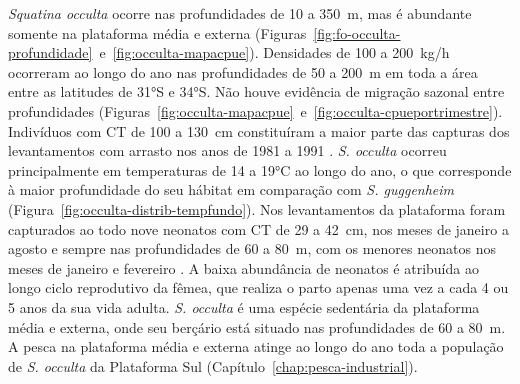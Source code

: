\documentclass[a4paper,11pt,twoside,showtrims,onecolumn,openright,final]{memoir}
\begin{document}
\emph{Squatina occulta} ocorre nas profundidades de 10 a 350~m, mas é abundante somente 
na plataforma média e externa (Figuras~\ref{fig:fo-occulta-profundidade}~e~\ref{fig:occulta-mapacpue}). %
Densidades de 100 a 200~kg/h ocorreram ao longo do ano nas profundidades de 50 a 200~m 
em toda a área entre as latitudes de 31°S e 34°S. Não houve evidência de migração 
sazonal entre profundidades (Figuras~\ref{fig:occulta-mapacpue}~e~\ref{fig:occulta-cpueportrimestre}). %
Indivíduos com CT de 100 a 130~cm constituíram a maior parte das capturas dos levantamentos 
com arrasto nos anos de 1981 a 1991 \citep{silva1996}. %
\emph{S. occulta} ocorreu principalmente em temperaturas de 14 a 19°C ao longo do ano, 
o que corresponde à maior profundidade do seu hábitat em comparação com \emph{S. guggenheim} (Figura~\ref{fig:occulta-distrib-tempfundo}). %
Nos levantamentos da plataforma foram capturados ao todo nove neonatos com CT de 29 a 42~cm, 
nos meses de janeiro a agosto e sempre nas profundidades de 60 a 80~m, com os menores neonatos 
nos meses de janeiro e fevereiro \citep{silva1996}. %
A baixa abundância de neonatos é atribuída ao longo ciclo reprodutivo da fêmea, que 
realiza o parto apenas uma vez a cada 4 ou 5 anos da sua vida adulta. 
\emph{S. occulta} é uma espécie sedentária da plataforma média e externa, onde seu berçário 
está situado nas profundidades de 60 a 80~m. A pesca na plataforma média e externa atinge 
ao longo do ano toda a população de \emph{S. occulta} da Plataforma Sul (Capítulo~\ref{chap:pesca-industrial}). %

%
%
\end{document}
